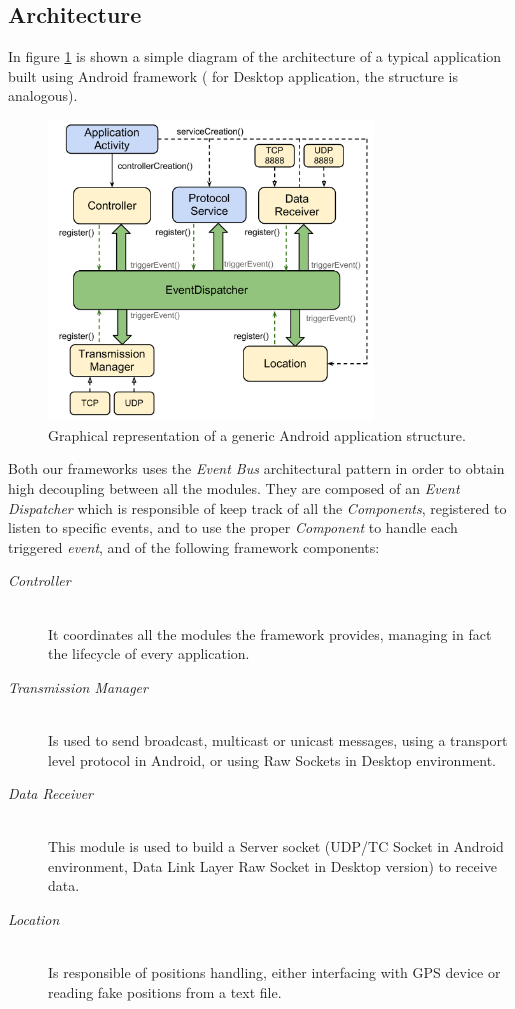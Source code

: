 \subsection{Architecture}

In figure \ref{fig:architecture} is shown a simple diagram of the architecture of a typical application built using Android framework ( for Desktop application, the structure is analogous).

\begin{figure}[htbp]
	\centering
	\includegraphics[trim = 10mm 0mm 0mm 0mm,width=3.4in]{imgs/components_architecture.pdf}
	\caption{Graphical representation of a generic Android application structure.}
	\label{fig:architecture}
\end{figure}

Both our frameworks uses the \textit{Event Bus} architectural pattern in order to obtain high decoupling between all the modules. 
They are composed of an \emph{Event Dispatcher} which is responsible of keep track of all the \emph{Components}, registered to listen to specific events, and to use the proper \emph{Component} to handle each triggered \emph{event}, and of the following framework components:
\begin{description}
	\item[\emph{Controller}]  \hfill \\
		It coordinates all the modules the framework provides, managing in fact the lifecycle of every application.
	\item[\emph{Transmission Manager}]  \hfill \\
		Is used to send broadcast, multicast or unicast messages, using a transport level protocol in Android, or using Raw Sockets in Desktop environment.
	\item[\emph{Data Receiver}] \hfill \\
		This module is used to build a Server socket (UDP/TC Socket in Android environment, Data Link Layer Raw Socket in Desktop version) to receive data.
	\item[\emph{Location}] \hfill \\
		Is responsible of positions handling, either interfacing with GPS device or reading fake positions from a text file.  
\end{description}

